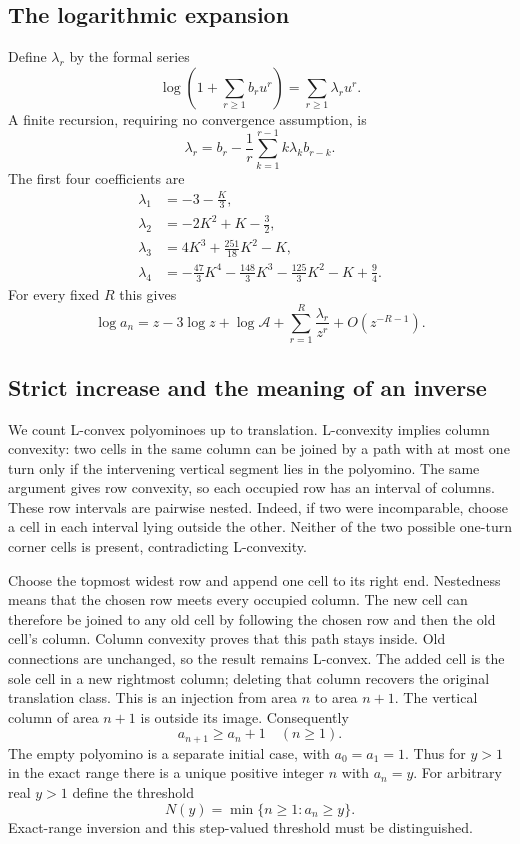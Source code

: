 \documentclass[11pt]{article}
\numberwithin{equation}{section}
\theoremstyle{definition}\newtheorem{definition}[theorem]{Definition}
\theoremstyle{remark}\newtheorem{remark}[theorem]{Remark}
\begin{document}
\subsection{The logarithmic expansion}
Define $\lambda_r$ by the formal series
\[
 \log\left(1+\sum_{r\ge1}b_r u^r\right)=\sum_{r\ge1}\lambda_r u^r.
\]
A finite recursion, requiring no convergence assumption, is
\[
 \lambda_r=b_r-\frac1r\sum_{k=1}^{r-1}k\lambda_k b_{r-k}.
\]
The first four coefficients are
\begin{align*}
 \lambda_1&=-3-\frac K3,\\
 \lambda_2&=-2K^2+K-\frac32,\\
 \lambda_3&=4K^3+\frac{251}{18}K^2-K,\\
 \lambda_4&=-\frac{47}{3}K^4-\frac{148}{3}K^3
             -\frac{125}{3}K^2-K+\frac94.
\end{align*}
For every fixed $R$ this gives
\begin{equation}\label{lcp:tr:eq:log-full}
 \log a_n=z-3\log z+\log\mathcal A
             +\sum_{r=1}^{R}\frac{\lambda_r}{z^r}+O(z^{-R-1}).
\end{equation}

\subsection{Strict increase and the meaning of an inverse}
We count L-convex polyominoes up to translation. L-convexity implies column
convexity: two cells in the same column can be joined by a path with at most one
turn only if the intervening vertical segment lies in the polyomino. The same
argument gives row convexity, so each occupied row has an interval of columns.
These row intervals are pairwise nested. Indeed, if two were incomparable,
choose a cell in each interval lying outside the other. Neither of the two
possible one-turn corner cells is present, contradicting L-convexity.

Choose the topmost widest row and append one cell to its right end. Nestedness
means that the chosen row meets every occupied column. The new cell can therefore
be joined to any old cell by following the chosen row and then the old cell's
column. Column convexity proves that this path stays inside. Old connections
are unchanged, so the result remains L-convex. The added cell is the sole cell
in a new rightmost column; deleting that column recovers the original
translation class. This is an injection from area $n$ to area $n+1$. The vertical
column of area $n+1$ is outside its image. Consequently
\[
 a_{n+1}\ge a_n+1\quad(n\ge1).
\]
The empty polyomino is a separate initial case, with $a_0=a_1=1$.
Thus for $y>1$ in the exact range there is a unique positive integer $n$ with
$a_n=y$. For arbitrary real $y>1$ define the threshold
\[
 N(y)=\min\{n\ge1:a_n\ge y\}.
\]
Exact-range inversion and this step-valued threshold must be distinguished.
\end{document}
